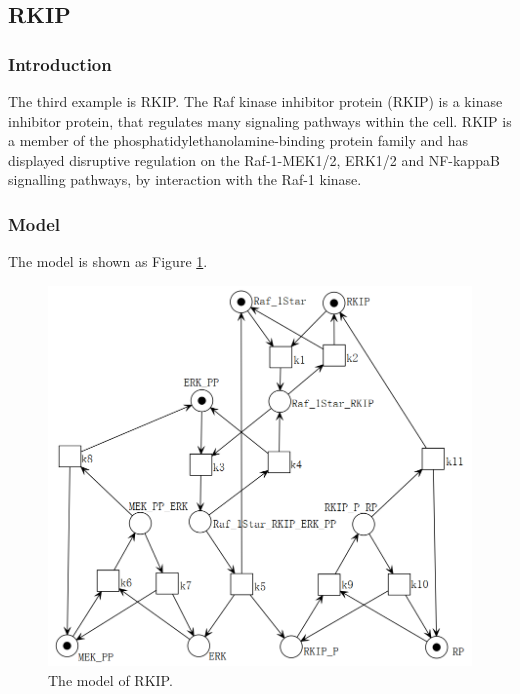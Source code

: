 \documentclass[journal,a4paper,onecolumn]{article}
\begin{document}
\clearpage
\subsection{RKIP}
\subsubsection{Introduction}
The third example is RKIP. The Raf kinase inhibitor protein (RKIP) is a kinase inhibitor protein, that regulates many signaling pathways within the cell. RKIP is a member of the phosphatidylethanolamine-binding protein family and has displayed disruptive regulation on the Raf-1-MEK1/2, ERK1/2 and NF-kappaB signalling pathways, by interaction with the Raf-1 kinase. \cite{rkip}
\subsubsection{Model}
The model is shown as Figure \ref{fig:The model of RKIP}.
\begin{figure}[!hbt]
	\begin{center}
		\includegraphics[width=\columnwidth]{fig28}
		\caption{The model of RKIP.}
		\label{fig:The model of RKIP}
	\end{center}
\end{figure}
\end{document}
